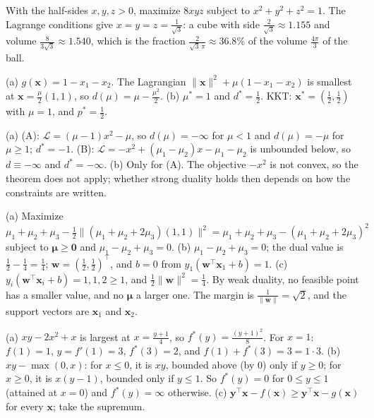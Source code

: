 \documentclass[11pt]{article}
\newcommand{\norm}[1]{\lVert #1 \rVert}
\begin{document}
\begin{description}[leftmargin=0pt, itemsep=0.3em]
    \item[\ref{pr:box-sphere}.] With the half-sides $x, y, z > 0$, maximize $8xyz$ subject to $x^2 + y^2 + z^2 = 1$. The Lagrange conditions give $x = y = z = \frac{1}{\sqrt{3}}$: a cube with side $\frac{2}{\sqrt{3}} \approx 1.155$ and volume $\frac{8}{3\sqrt{3}} \approx 1.540$, which is the fraction $\frac{2}{\sqrt{3}\,\pi} \approx 36.8\%$ of the volume $\frac{4\pi}{3}$ of the ball.
    \item[\ref{pr:dual-practice}.] (a) $g(\mathbf{x}) = 1 - x_1 - x_2$. The Lagrangian $\norm{\mathbf{x}}^2 + \mu(1 - x_1 - x_2)$ is smallest at $\mathbf{x} = \frac{\mu}{2}(1, 1)$, so $d(\mu) = \mu - \frac{\mu^2}{2}$. (b) $\mu^* = 1$ and $d^* = \frac{1}{2}$. KKT: $\mathbf{x}^* = (\frac{1}{2}, \frac{1}{2})$ with $\mu = 1$, and $p^* = \frac{1}{2}$.
    \item[\ref{pr:duality-gap}.] (a) (A): $\mathcal{L} = (\mu - 1)x^2 - \mu$, so $d(\mu) = -\infty$ for $\mu < 1$ and $d(\mu) = -\mu$ for $\mu \geq 1$; $d^* = -1$. (B): $\mathcal{L} = -x^2 + (\mu_1 - \mu_2)x - \mu_1 - \mu_2$ is unbounded below, so $d \equiv -\infty$ and $d^* = -\infty$. (b) Only for (A). The objective $-x^2$ is not convex, so the theorem does not apply; whether strong duality holds then depends on how the constraints are written.
    \item[\ref{pr:svm-dual-practice}.] (a) Maximize $\mu_1 + \mu_2 + \mu_3 - \frac{1}{2}\norm{(\mu_1 + \mu_2 + 2\mu_3)(1, 1)}^2 = \mu_1 + \mu_2 + \mu_3 - (\mu_1 + \mu_2 + 2\mu_3)^2$ subject to $\boldsymbol{\mu} \geq \mathbf{0}$ and $\mu_1 - \mu_2 + \mu_3 = 0$. (b) $\mu_1 - \mu_2 + \mu_3 = 0$; the dual value is $\frac{1}{2} - \frac{1}{4} = \frac{1}{4}$; $\mathbf{w} = (\frac{1}{2}, \frac{1}{2})^\top$, and $b = 0$ from $y_1(\mathbf{w}^\top\mathbf{x}_1 + b) = 1$. (c) $y_i(\mathbf{w}^\top\mathbf{x}_i + b) = 1, 1, 2 \geq 1$, and $\frac{1}{2}\norm{\mathbf{w}}^2 = \frac{1}{4}$. By weak duality, no feasible point has a smaller value, and no $\boldsymbol{\mu}$ a larger one. The margin is $\frac{1}{\norm{\mathbf{w}}} = \sqrt{2}$, and the support vectors are $\mathbf{x}_1$ and $\mathbf{x}_2$.
    \item[\ref{pr:conjugate}.] (a) $xy - 2x^2 + x$ is largest at $x = \frac{y + 1}{4}$, so $f^*(y) = \frac{(y + 1)^2}{8}$. For $x = 1$: $f(1) = 1$, $y = f'(1) = 3$, $f^*(3) = 2$, and $f(1) + f^*(3) = 3 = 1 \cdot 3$. (b) $xy - \max(0, x)$: for $x \leq 0$, it is $xy$, bounded above (by $0$) only if $y \geq 0$; for $x \geq 0$, it is $x(y - 1)$, bounded only if $y \leq 1$. So $f^*(y) = 0$ for $0 \leq y \leq 1$ (attained at $x = 0$) and $f^*(y) = \infty$ otherwise. (c) $\mathbf{y}^\top\mathbf{x} - f(\mathbf{x}) \geq \mathbf{y}^\top\mathbf{x} - g(\mathbf{x})$ for every $\mathbf{x}$; take the supremum.

\end{description}
\end{document}
